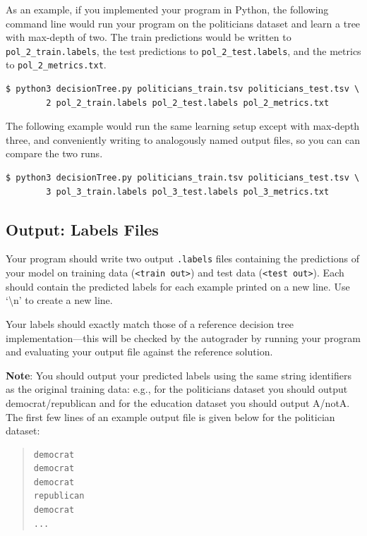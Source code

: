 \documentclass[11pt,addpoints,answers]{exam}
\begin{document}
As an example, if you implemented your program in Python, the following command line would run your program on the politicians dataset and learn a tree with max-depth of two. The train predictions would be written to \lstinline{pol_2_train.labels}, the test predictions to \lstinline{pol_2_test.labels}, and the metrics to \lstinline{pol_2_metrics.txt}.
%
\begin{lstlisting}[language=Shell]
$ python3 decisionTree.py politicians_train.tsv politicians_test.tsv \ 
        2 pol_2_train.labels pol_2_test.labels pol_2_metrics.txt
\end{lstlisting}
%
The following example would run the same learning setup except with max-depth three, and conveniently writing to analogously named output files, so you can can compare the two runs.
%
\begin{lstlisting}[language=Shell]
$ python3 decisionTree.py politicians_train.tsv politicians_test.tsv \ 
        3 pol_3_train.labels pol_3_test.labels pol_3_metrics.txt
\end{lstlisting}

\subsection{Output: Labels Files}
\label{sec:labels}

Your program should write two output \lstinline{.labels} files containing the predictions of your model on training data (\lstinline{<train out>}) and test data (\lstinline{<test out>}). Each should contain the predicted labels for each example printed on a new line. Use `\textbackslash n' to create a new line.

Your labels should exactly match those of a reference decision tree implementation---this will be checked by the autograder by running your program and evaluating your output file against the reference solution.

\textbf{Note}: You should output your predicted labels using the same string identifiers as the original training data: e.g., for the politicians dataset you should output democrat/republican and for the education dataset you should output A/notA.
%
The first few lines of an example output file is given below for the politician dataset:
\begin{quote}
\begin{verbatim}
democrat
democrat
democrat
republican
democrat
...
\end{verbatim}
\end{quote}
\end{document}
